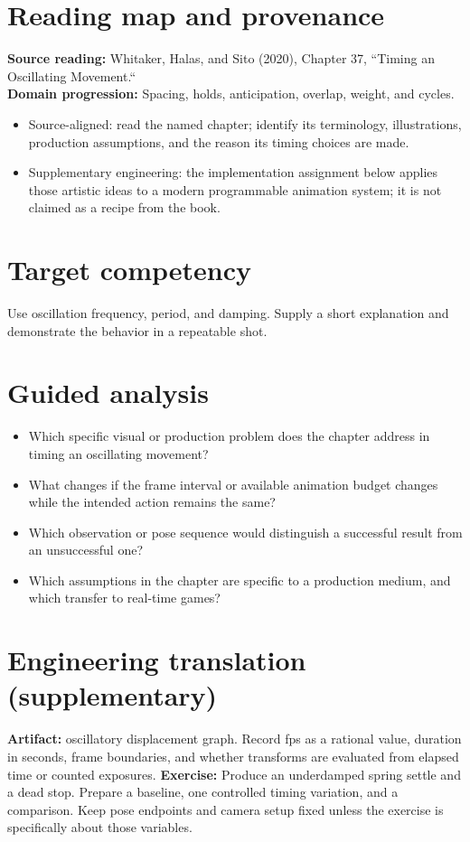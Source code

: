 \documentclass[10pt,letterpaper]{article}
\begin{document}
\makedoctitle
\makedocsummary

\section{Reading map and provenance}
\textbf{Source reading:} Whitaker, Halas, and Sito (2020), Chapter 37, ``Timing an Oscillating Movement.``\\
\textbf{Domain progression:} Spacing, holds, anticipation, overlap, weight, and cycles.
\begin{itemize}
\item Source-aligned: read the named chapter; identify its terminology, illustrations, production assumptions, and the reason its timing choices are made.
\item Supplementary engineering: the implementation assignment below applies those artistic ideas to a modern programmable animation system; it is not claimed as a recipe from the book.
\end{itemize}
\section{Target competency}
Use oscillation frequency, period, and damping. Supply a short explanation and demonstrate the behavior in a repeatable shot.
\section{Guided analysis}
\begin{itemize}
\item Which specific visual or production problem does the chapter address in timing an oscillating movement?
\item What changes if the frame interval or available animation budget changes while the intended action remains the same?
\item Which observation or pose sequence would distinguish a successful result from an unsuccessful one?
\item Which assumptions in the chapter are specific to a production medium, and which transfer to real-time games?
\end{itemize}
\section{Engineering translation (supplementary)}
\textbf{Artifact:} oscillatory displacement graph. Record fps as a rational value, duration in seconds, frame boundaries, and whether transforms are evaluated from elapsed time or counted exposures.
\textbf{Exercise:} Produce an underdamped spring settle and a dead stop. Prepare a baseline, one controlled timing variation, and a comparison. Keep pose endpoints and camera setup fixed unless the exercise is specifically about those variables.
\end{document}
